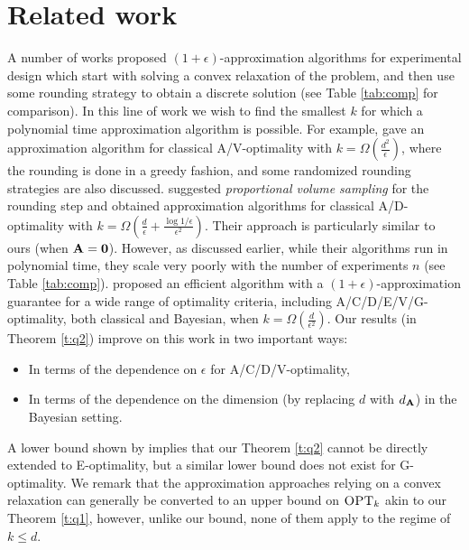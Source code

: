 \documentclass[../../thesis.tex]{subfiles}
\begin{document}
\section{Related work}
\label{s:related-work}

A number of works proposed $(1+\epsilon)$-approximation algorithms
for experimental design which start with solving a convex
relaxation of the problem, and then use some rounding strategy to
obtain a discrete solution (see Table \ref{tab:comp} for comparison).
In this line of work we wish to find the smallest $k$ for which a
polynomial time approximation algorithm is possible. For example,
\cite{tractable-experimental-design} gave an approximation algorithm
for classical A/V-optimality with $k=\Omega(\frac{d^2}{\epsilon})$, where the
rounding is done in a greedy fashion, and some randomized rounding
strategies are also discussed. \cite{proportional-volume-sampling}
suggested \emph{proportional volume sampling} for the rounding step
and obtained approximation algorithms for classical A/D-optimality with
$k=\Omega(\frac d\epsilon+\frac {\log1/\epsilon}{\epsilon^2})$. Their
approach is particularly similar to ours (when $\mathbf A=\mathbf 0$). However,
as discussed earlier, while their algorithms run in polynomial time,
they scale very poorly with the number of experiments $n$ (see Table
\ref{tab:comp}). \cite{near-optimal-design} proposed
an efficient algorithm with a $(1+\epsilon)$-approximation guarantee for a wide
range of optimality criteria, including A/C/D/E/V/G-optimality, both classical and Bayesian, when
$k=\Omega(\frac d{\epsilon^2})$.  Our results (in Theorem \ref{t:q2}) improve on this work in
two important ways:
\begin{itemize}
  \item In terms of the dependence on $\epsilon$ for A/C/D/V-optimality,
  \item In terms of the dependence on the dimension
        (by replacing $d$ with $d_{\mathbf A}$) in the Bayesian setting.
\end{itemize}
A lower bound shown by \cite{proportional-volume-sampling} implies that our
Theorem \ref{t:q2} cannot be
directly extended to E-optimality, but a similar lower bound does not
exist for G-optimality. We remark that the approximation approaches
relying on a convex relaxation can generally be converted to
an upper bound on ${\textsc{OPT}_k}$ akin to our Theorem \ref{t:q1},
however, unlike our bound, none of them apply to the regime of $k\leq d$.
\end{document}
